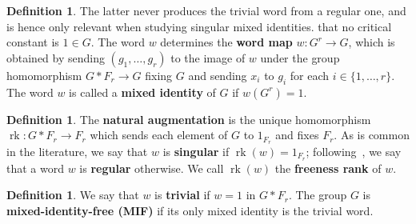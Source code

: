 \documentclass{article}
\theoremstyle{remark}
\newtheorem{remark}[theorem]{Remark}
\theoremstyle{definition}
\newtheorem{definition}[theorem]{Definition}
\DeclareMathOperator{\rk}{rk}
\begin{document}
{\begin{definition}
{{The latter never produces the trivial word from a regular one, and is hence only relevant when studying singular mixed identities.}} 
 that no critical constant is $1\in G$.
 The word $w$ determines the \textbf{word map} $w\colon G^r\to G$, which is obtained by sending $(g_1, \dots, g_r)$ to the image of $w$ under the {group homomorphism $G*F_r\to G$} fixing $G$ and sending $x_i$ to $g_i$ for each {$i\in\{1,\ldots,r\}$}.  The word $w$ is called a \textbf{mixed identity} of $G$ if $w(G^r)=1$.    
 \end{definition}
 \begin{definition}\label{def:singular}
 The \textbf{natural augmentation} is the unique homomorphism  $\rk\colon G*F_r\to F_r$ which sends  each element of $G$ to $1_{F_r}$ and fixes $F_r$. %
  As is common in the literature, we say that $w$ is \textbf{singular} if $\rk(w)=1_{F_r}$; following~\cite{pestov2008hyperlinear}, we say that a word $w$ is  \textbf{regular} otherwise. We call $\rk(w)$ the \textbf{freeness rank} of $w$.   
\end{definition}


\begin{definition}
{We say that $w$ is \textbf{trivial} if $w=1$ in $G*F_r$. %
  The group $G$ is \textbf{mixed-identity-free (MIF)} if its only mixed identity is the trivial word.}
\end{definition}


}
\end{document}
